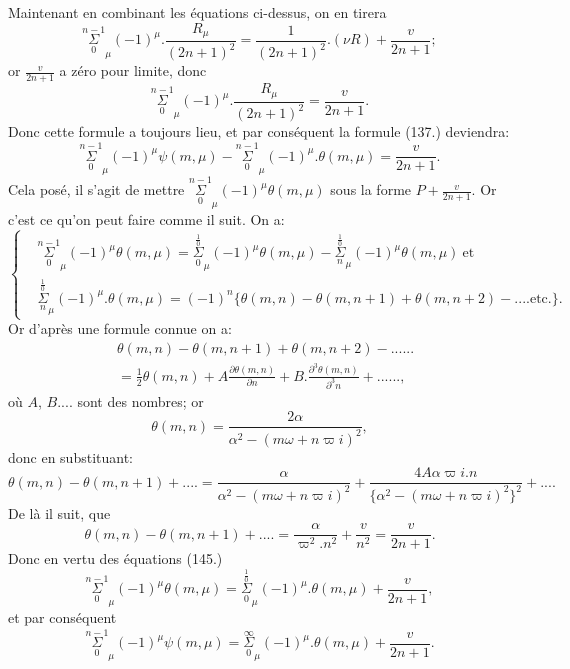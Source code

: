 \documentclass{article}
\begin{document}
Maintenant en combinant les équations ci-dessus, on en tirera
\[ \overset{n-1}{\underset{0}{\Sigma}}_{\mu}(-1)^{\mu}.\frac{R_{\mu}}{(2n+1)^{2}}=\frac{1}{(2n+1)^{2}}.(\nu R)+\frac{v}{2n+1}; \]
or $\frac{v}{2n+1}$ a zéro pour limite, donc
\[ \overset{n-1}{\underset{0}{\Sigma}}_{\mu}(-1)^{\mu}.\frac{R_{\mu}}{(2n+1)^{2}}=\frac{v}{2n+1}. \]
Donc cette formule a toujours lieu, et par conséquent la formule (137.) deviendra:
\[ \overset{n-1}{\underset{0}{\Sigma}}_{\mu}(-1)^{\mu}\psi(m,\mu)-\overset{n-1}{\underset{0}{\Sigma}}_{\mu}(-1)^{\mu}.\theta(m,\mu)=\frac{v}{2n+1}. \tag{144.} \]
Cela posé, il s'agit de mettre $\overset{n-1}{\underset{0}{\Sigma}}_{\mu}(-1)^{\mu}\theta(m,\mu)$ sous la forme $P+\frac{v}{2n+1}$.
Or c'est ce qu'on peut faire comme il suit. On a:
\[ \left\{\begin{aligned}
&\overset{n-1}{\underset{0}{\Sigma}}_{\mu}(-1)^{\mu}\theta(m,\mu)=\overset{\frac{1}{0}}{\underset{0}{\Sigma}}_{\mu}(-1)^{\mu}\theta(m,\mu)-\overset{\frac{1}{0}}{\underset{n}{\Sigma}}_{\mu}(-1)^{\mu}\theta(m,\mu)\ \text{et}\\
&\overset{\frac{1}{0}}{\underset{n}{\Sigma}}_{\mu}(-1)^{\mu}.\theta(m,\mu)=(-1)^{n}\{\theta(m,n)-\theta(m,n+1)+\theta(m,n+2)-....\text{etc.}\}.
\end{aligned}\right. \tag{145.} \]
Or d'après une formule connue on a:
\[ \begin{aligned}
&\theta(m,n)-\theta(m,n+1)+\theta(m,n+2)-......\\
&=\tfrac{1}{2}\theta(m,n)+A\frac{\partial\theta(m,n)}{\partial n}+B.\frac{\partial^{3}\theta(m,n)}{\partial^{3}n}+......,
\end{aligned} \]
où $A$, $B$$....$ sont des nombres; or
\[ \theta(m,n)=\frac{2\alpha}{\alpha^{2}-(m\omega+n\varpi i)^{2}}, \]
donc en substituant:
\[ \theta(m,n)-\theta(m,n+1)+....=\frac{\alpha}{\alpha^{2}-(m\omega+n\varpi i)^{2}}+\frac{4A\alpha\varpi i.n}{\{\alpha^{2}-(m\omega+n\varpi i)^{2}\}^{2}}+.... \]
De là il suit, que
\[ \theta(m,n)-\theta(m,n+1)+....=\frac{\alpha}{\varpi^{2}.n^{2}}+\frac{v}{n^{2}}=\frac{v}{2n+1}. \]
Donc en vertu des équations (145.)
\[ \overset{n-1}{\underset{0}{\Sigma}}_{\mu}(-1)^{\mu}\theta(m,\mu)=\overset{\frac{1}{0}}{\underset{0}{\Sigma}}_{\mu}(-1)^{\mu}.\theta(m,\mu)+\frac{v}{2n+1}, \]
et par conséquent
\[ \overset{n-1}{\underset{0}{\Sigma}}_{\mu}(-1)^{\mu}\psi(m,\mu)=\overset{\infty}{\underset{0}{\Sigma}}_{\mu}(-1)^{\mu}.\theta(m,\mu)+\frac{v}{2n+1}. \tag{146.} \]
\end{document}
